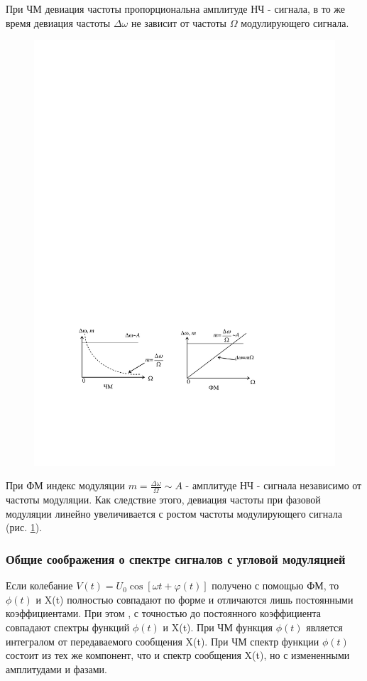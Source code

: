 При ЧМ девиация частоты пропорциональна амплитуде НЧ - сигнала, в то же время девиация частоты $\Delta \omega$ не зависит от частоты $\Omega$ модулирующего сигнала.
\begin{figure}[H]
	\centering
	\includegraphics[]{fig/fig2-3}
	\caption{}
	\label{fig:2.3}
\end{figure}
При ФМ индекс модуляции $m=\frac{\Delta \omega}{\Omega} \sim A$ - амплитуде НЧ - сигнала независимо от
частоты модуляции. Как следствие этого, девиация частоты при фазовой модуляции линейно увеличивается с ростом частоты модулирующего сигнала (рис. \ref{fig:2.3}).

\subsubsection{Общие соображения о спектре сигналов с угловой модуляцией}
Если колебание $V(t)=U_{0} \cos [\omega t+\varphi(t)]$
получено с помощью ФМ, то $\phi(t)$ и X(t) полностью совпадают по форме и отличаются лишь постоянными коэффициентами. При этом , с точностью до постоянного коэффициента совпадают спектры функций $\phi(t)$ и X(t).
При ЧМ функция $\phi(t)$ является интегралом от передаваемого сообщения X(t). При ЧМ спектр функции $\phi(t)$ состоит из тех же компонент, что и спектр сообщения X(t), но с измененными амплитудами и фазами.

